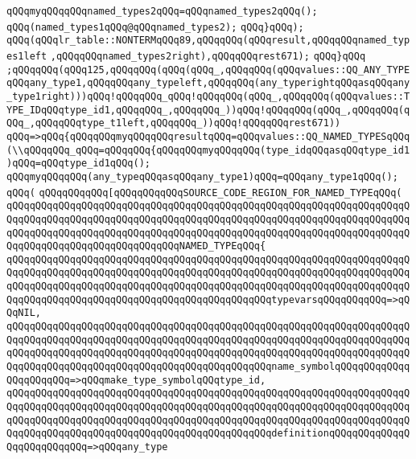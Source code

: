 \verb|qQQqmyqQQqqQQqnamed_types2qQQq=qQQqnamed_types2qQQq();|\newline
\verb|qQQq(named_types1qQQq@qQQqnamed_types2);|\newline
\verb|qQQq}qQQq);|\newline
\verb|qQQq(qQQqlr_table::NONTERMqQQq89,qQQqqQQq(qQQqresult,qQQqqQQqnamed_types1left|\newline
\verb|,qQQqqQQqnamed_types2right),qQQqqQQqrest671);|\newline
\verb|qQQq}qQQq|\newline
\verb|;qQQqqQQq(qQQq125,qQQqqQQq(qQQq(qQQq_,qQQqqQQq(qQQqvalues::QQ_ANY_TYPEqQQqany_type1,qQQqqQQqany_typeleft,qQQqqQQq(any_typerightqQQqasqQQqany_type1right)))qQQq!qQQqqQQq_qQQq!qQQqqQQq(qQQq_,qQQqqQQq(qQQqvalues::TYPE_IDqQQqtype_id1,qQQqqQQq_,qQQqqQQq_))qQQq!qQQqqQQq(qQQq_,qQQqqQQq(qQQq_,qQQqqQQqtype_t1left,qQQqqQQq_))qQQq!qQQqqQQqrest671))|\newline
\verb|qQQq=>qQQq{qQQqqQQqmyqQQqqQQqresultqQQq=qQQqvalues::QQ_NAMED_TYPESqQQq(\\qQQqqQQq_qQQq=qQQqqQQq{qQQqqQQqmyqQQqqQQq(type_idqQQqasqQQqtype_id1)qQQq=qQQqtype_id1qQQq();|\newline
\verb|qQQqmyqQQqqQQq(any_typeqQQqasqQQqany_type1)qQQq=qQQqany_type1qQQq();|\newline
\verb|qQQq(|\newline
\verb|qQQqqQQqqQQq[qQQqqQQqqQQqSOURCE_CODE_REGION_FOR_NAMED_TYPEqQQq(|\newline
\verb|qQQqqQQqqQQqqQQqqQQqqQQqqQQqqQQqqQQqqQQqqQQqqQQqqQQqqQQqqQQqqQQqqQQqqQQqqQQqqQQqqQQqqQQqqQQqqQQqqQQqqQQqqQQqqQQqqQQqqQQqqQQqqQQqqQQqqQQqqQQqqQQqqQQqqQQqqQQqqQQqqQQqqQQqqQQqqQQqqQQqqQQqqQQqqQQqqQQqqQQqqQQqqQQqqQQqqQQqqQQqqQQqqQQqqQQqqQQqqQQqNAMED_TYPEqQQq{|\newline
\verb|qQQqqQQqqQQqqQQqqQQqqQQqqQQqqQQqqQQqqQQqqQQqqQQqqQQqqQQqqQQqqQQqqQQqqQQqqQQqqQQqqQQqqQQqqQQqqQQqqQQqqQQqqQQqqQQqqQQqqQQqqQQqqQQqqQQqqQQqqQQqqQQqqQQqqQQqqQQqqQQqqQQqqQQqqQQqqQQqqQQqqQQqqQQqqQQqqQQqqQQqqQQqqQQqqQQqqQQqqQQqqQQqqQQqqQQqqQQqqQQqqQQqqQQqqQQqqQQqtypevarsqQQqqQQqqQQq=>qQQqNIL,|\newline
\verb|qQQqqQQqqQQqqQQqqQQqqQQqqQQqqQQqqQQqqQQqqQQqqQQqqQQqqQQqqQQqqQQqqQQqqQQqqQQqqQQqqQQqqQQqqQQqqQQqqQQqqQQqqQQqqQQqqQQqqQQqqQQqqQQqqQQqqQQqqQQqqQQqqQQqqQQqqQQqqQQqqQQqqQQqqQQqqQQqqQQqqQQqqQQqqQQqqQQqqQQqqQQqqQQqqQQqqQQqqQQqqQQqqQQqqQQqqQQqqQQqqQQqqQQqqQQqqQQqname_symbolqQQqqQQqqQQqqQQqqQQqqQQq=>qQQqmake_type_symbolqQQqtype_id,|\newline
\verb|qQQqqQQqqQQqqQQqqQQqqQQqqQQqqQQqqQQqqQQqqQQqqQQqqQQqqQQqqQQqqQQqqQQqqQQqqQQqqQQqqQQqqQQqqQQqqQQqqQQqqQQqqQQqqQQqqQQqqQQqqQQqqQQqqQQqqQQqqQQqqQQqqQQqqQQqqQQqqQQqqQQqqQQqqQQqqQQqqQQqqQQqqQQqqQQqqQQqqQQqqQQqqQQqqQQqqQQqqQQqqQQqqQQqqQQqqQQqqQQqqQQqqQQqqQQqqQQqdefinitionqQQqqQQqqQQqqQQqqQQqqQQqqQQq=>qQQqany_type|\newline
